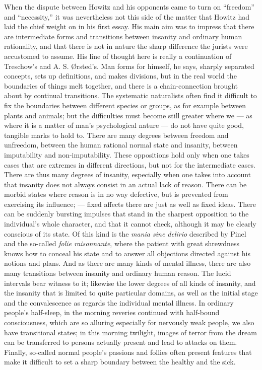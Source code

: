 \documentclass[12pt,a4paper]{book}
\newcommand{\opage}[1]{\marginnote{\footnotesize\textit{[#1]}}}
\begin{document}
When the dispute between Howitz and his opponents came to turn on ``freedom'' and
``necessity,'' it was nevertheless not this side of the matter that Howitz had laid the
chief weight on in his first essay. His main aim was to impress that there are
intermediate forms and transitions between insanity and ordinary human rationality, and
that there is not in nature the sharp difference the jurists were accustomed to assume.
His line of thought here is really a continuation of Treschow's and A. S. Ørsted's. Man
forms for himself, he says, sharply separated concepts, sets up definitions, and makes
divisions, but in the real world the boundaries of things melt together, and there is a
chain-connection brought about by continual transitions. The systematic naturalists often
find it difficult to fix the boundaries between different species or groups, as for
example between plants and animals; but the difficulties must become still greater where
we --- as where it is a matter of man's psychological nature --- do not have quite good,
tangible marks to hold to. There are many degrees between freedom and unfreedom, between
the human rational normal state and insanity, between imputability and non-imputability.
These oppositions hold only when one takes cases that are extremes in different
directions, but not for the intermediate cases. There are thus many degrees of insanity,
especially when one takes into account that insanity does not always consist in an actual
lack of reason. There can be morbid states where reason is in no way defective, but is
prevented from \opage{83}exercising its influence; --- fixed affects there are just as well as fixed
ideas. There can be suddenly bursting impulses that stand in the sharpest opposition to
the individual's whole character, and that it cannot check, although it may be clearly
conscious of its state. Of this kind is the \emph{mania sine delirio} described by Pinel
and the so-called \emph{folie raisonnante}, where the patient with great shrewdness knows
how to conceal his state and to answer all objections directed against his notions and
plans. And as there are many kinds of mental illness, there are also many transitions
between insanity and ordinary human reason. The lucid intervals bear witness to it;
likewise the lower degrees of all kinds of insanity, and the insanity that is limited to
quite particular domains, as well as the initial stage and the convalescence as regards
the individual mental illness. In ordinary people's half-sleep, in the morning reveries
continued with half-bound consciousness, which are so alluring especially for nervously
weak people, we also have transitional states; in this morning twilight, images of terror
from the dream can be transferred to persons actually present and lead to attacks on them.
Finally, so-called normal people's passions and follies often present features that make
it difficult to set a sharp boundary between the healthy and the sick.
\end{document}
